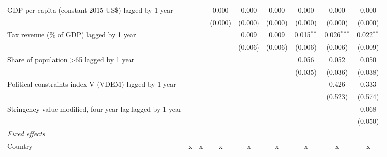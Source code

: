 \begin{tabular}{lcccccccc}
   GDP per capita (constant 2015 US\$) lagged by 1 year                    &                &                & 0.000          & 0.000          & 0.000          & 0.000          & 0.000          & 0.000\\   
                                                                           &                &                & (0.000)        & (0.000)        & (0.000)        & (0.000)        & (0.000)        & (0.000)\\   
   Tax revenue (\% of GDP) lagged by 1 year                                &                &                &                & 0.009          & 0.009          & 0.015$^{**}$   & 0.026$^{***}$  & 0.022$^{**}$\\   
                                                                           &                &                &                & (0.006)        & (0.006)        & (0.006)        & (0.006)        & (0.009)\\   
   Share of population >65 lagged by 1 year                                &                &                &                &                &                & 0.056          & 0.052          & 0.050\\   
                                                                           &                &                &                &                &                & (0.035)        & (0.036)        & (0.038)\\   
   Political constraints index V (VDEM) lagged by 1 year                   &                &                &                &                &                &                & 0.426          & 0.333\\   
                                                                           &                &                &                &                &                &                & (0.523)        & (0.574)\\   
   Stringency value modified, four-year lag lagged by 1 year               &                &                &                &                &                &                &                & 0.068\\   
                                                                           &                &                &                &                &                &                &                & (0.050)\\   
   \emph{Fixed effects}\\
   Country                                                                 & x              & x              & x              & x              & x              & x              & x              & x\\  

\end{tabular}
